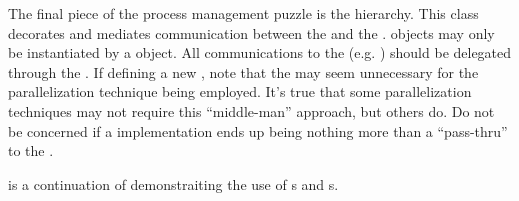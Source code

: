 The final piece of the process management puzzle is the
 hierarchy.  This class decorates and
mediates communication between the  and the .  
 objects may only be instantiated by
a  object.  All communications to the 
(e.g. ) should be delegated through the
.  If defining a new , note
that the  may seem unnecessary for the
parallelization technique being employed.  It's true
that some parallelization techniques may not require this ``middle-man''
approach, but others do.  Do not be concerned if a  implementation ends up being nothing more than a ``pass-thru'' to
the .

 is a continuation of
 demonstraiting the use of s
and s.

